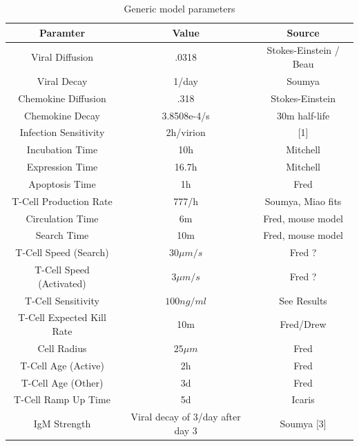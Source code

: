 \documentclass[10pt]{article}
\begin{document}
\begin{table}
\begin{tabular}{ | c | c | c | }
  \hline                        
  Paramter & Value & Source \\
  \hline
  Viral Diffusion & .0318 & Stokes-Einstein / Beau \\
  Viral Decay &  1/day & Soumya \\
  Chemokine Diffusion & .318 & Stokes-Einstein \\
  Chemokine Decay &  3.8508e-4/s & 30m half-life \\
  Infection Sensitivity &  2h/virion & [1] \\
  Incubation Time &  10h & Mitchell \\
  Expression Time &  16.7h & Mitchell \\
  Apoptosis Time & 1h & Fred \\
  T-Cell Production Rate & 777/h & Soumya, Miao fits \\ 
  Circulation Time & 6m & Fred, mouse model \\
  Search Time & 10m & Fred, mouse model \\
  T-Cell Speed (Search) & $30 \mu m/s$ & Fred ? \\
  T-Cell Speed (Activated) & $3 \mu m/s$ & Fred ?\\
  T-Cell Sensitivity & $100 ng/ml$ & See Results \\
  T-Cell Expected Kill Rate & 10m & Fred/Drew \\
  Cell Radius & $25 \mu m$ & Fred \\
  T-Cell Age (Active) & 2h & Fred \\
  T-Cell Age (Other) & 3d & Fred \\
  T-Cell Ramp Up Time & 5d & Icaris \\
  IgM Strength & Viral decay of 3/day after day 3 & Soumya [3] \\
  \hline  
\end{tabular}
\caption{Generic model parameters}
\label{table:parameters}
\end{table}
\end{document}
